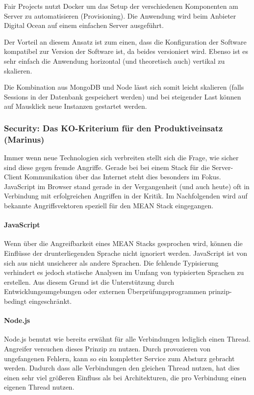 \documentclass[]{article}
\begin{document}
Fair Projects nutzt Docker um das Setup der verschiedenen Komponenten am
Server zu automatisieren (Provisioning). Die Anwendung wird beim
Anbieter Digital Ocean auf einem einfachen Server ausgeführt.

Der Vorteil an diesem Ansatz ist zum einen, dass die Konfiguration der
Software kompatibel zur Version der Software ist, da beides versioniert
wird. Ebenso ist es sehr einfach die Anwendung horizontal (und
theoretisch auch) vertikal zu skalieren.

Die Kombination aus MongoDB und Node lässt sich somit leicht skalieren
(falls Sessions in der Datenbank gespeichert werden) und bei steigender
Last können auf Mausklick neue Instanzen gestartet werden.

\subsubsection{Security: Das KO-Kriterium für den Produktiveinsatz
(Marinus)}\label{security-das-ko-kriterium-fuxfcr-den-produktiveinsatz-marinus}

Immer wenn neue Technologien sich verbreiten stellt sich die Frage, wie
sicher sind diese gegen fremde Angriffe. Gerade bei bei einem Stack für
die Server-Client Kommunikation über das Internet steht dies besonders
im Fokus. JavaScript im Browser stand gerade in der Vergangenheit (und
auch heute) oft in Verbindung mit erfolgreichen Angriffen in der Kritik.
Im Nachfolgenden wird auf bekannte Angriffsvektoren speziell für den
MEAN Stack eingegangen.

\paragraph{JavaScript}\label{javascript}

Wenn über die Angreifbarkeit eines MEAN Stacks gesprochen wird, können
die Einflüsse der drunterliegenden Sprache nicht ignoriert werden.
JavaScript ist von sich aus nicht unsicherer als andere Sprachen. Die
fehlende Typisierung verhindert es jedoch statische Analysen im Umfang
von typisierten Sprachen zu erstellen. Aus diesem Grund ist die
Unterstützung durch Entwicklungsumgebungen oder externen
Überprüfungsprogrammen prinzip-bedingt eingeschränkt.

\paragraph{Node.js}\label{node.js}

Node.js benutzt wie bereits erwähnt für alle Verbindungen lediglich
einen Thread. Angreifer versuchen dieses Prinzip zu nutzen. Durch
provozieren von ungefangenen Fehlern, kann so ein kompletter Service zum
Absturz gebracht werden. Dadurch dass alle Verbindungen den gleichen
Thread nutzen, hat dies einen sehr viel größeren Einfluss als bei
Architekturen, die pro Verbindung einen eigenen Thread nutzen.
\end{document}
